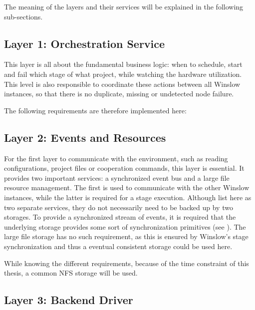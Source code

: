 The meaning of the layers and their services will be explained in the following sub-sections.

\subsection{Layer 1: Orchestration Service}

This layer is all about the fundamental business logic: when to schedule, start and fail which stage of what project, while watching the hardware utilization.
This level is also responsible to coordinate these actions between all Winslow instances, so that there is no duplicate, missing or undetected node failure.

The following requirements are therefore implemented here: 

\subsection{Layer 2: Events and Resources}
\label{architecture:layer:event_bus}

For the first layer to communicate with the environment, such as reading configurations, project files or cooperation commands, this layer is essential.
It provides two important services: a synchronized event bus and a large file resource management.
The first is used to communicate with the other Winslow instances, while the latter is required for a stage execution.
Although list here as two separate services, they do not necessarily need to be backed up by two storages.
To provide a synchronized stream of events, it is required that the underlying storage provides some sort of synchronization primitives (see ).
The large file storage has no such requirement, as this is ensured by Winslow's stage synchronization and thus a eventual consistent storage could be used here.

While knowing the different requirements, because of the time constraint of this thesis, a common NFS storage will be used.

\subsection{Layer 3: Backend Driver}

